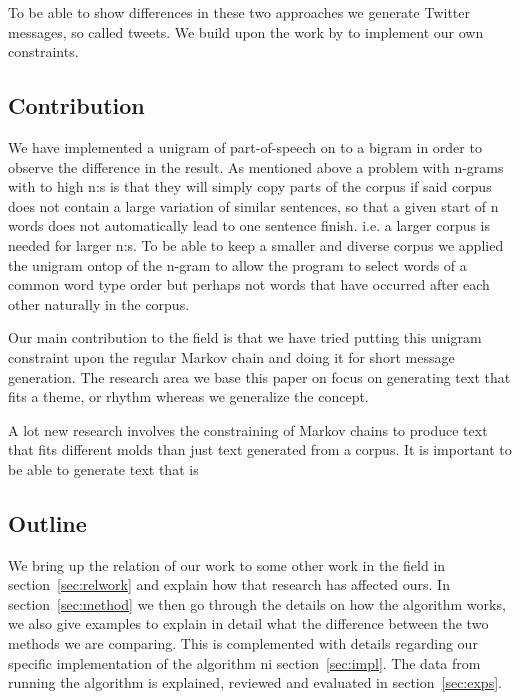 \documentclass[a4paper,12pt]{article}
\begin{document}
To be able to show differences in these two approaches we generate Twitter messages, so called tweets. 
We build upon the work by \citealp{McBarb} to implement our own constraints.

   
\subsection{Contribution}

We have implemented a unigram of part-of-speech on to a bigram in order to observe the difference in the result. 
As mentioned above a problem with n-grams with to high n:s is that they will simply copy parts of the corpus if said corpus does not contain a large variation of similar sentences, 
so that a given start of n words does not automatically lead to one sentence finish. i.e. a larger corpus is needed for larger n:s.
To be able to keep a smaller and diverse corpus we applied the unigram ontop of the n-gram to allow the program to select words of a common word type order
but perhaps not words that have occurred after each other naturally in the corpus. 

Our main contribution to the field is that we have tried putting this unigram constraint upon the regular Markov chain and doing it for short message generation.
The research area we base this paper on focus on generating text that fits a theme, or rhythm whereas we generalize the concept.


A lot new research involves the constraining of Markov chains to produce text that fits different molds than just text generated from a corpus. 
It is important to be able to generate text that is 

\subsection{Outline}
We bring up the relation of our work to some other work in the field \cite{McBarb} in section~\ref{sec:relwork} and explain how that research has affected ours. 
In section~\ref{sec:method} we then go through the details on how the algorithm works, 
we also give examples to explain in detail what the difference between the two methods we are comparing. This is complemented with details regarding our specific
implementation of the algorithm ni section~\ref{sec:impl}. The data from running the algorithm is explained, reviewed and evaluated in section~\ref{sec:exps}.

\newpage
\end{document}
